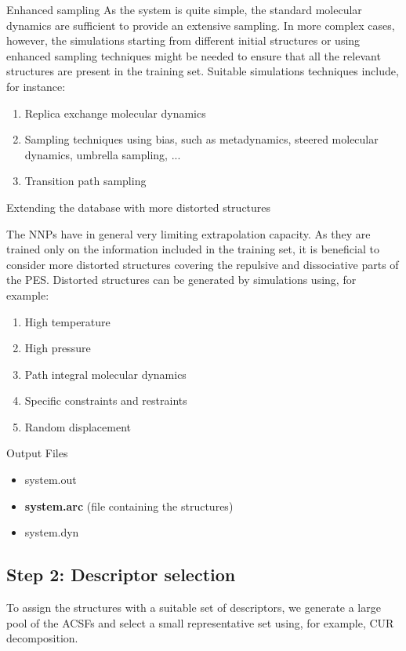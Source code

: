 \documentclass[12pt]{article}
\newcommand\Warning{%
 \makebox[1.4em][c]{%
 \makebox[0pt][c]{\raisebox{.1em}{\small!}}%
 \makebox[0pt][c]{\color{red}\Large$\bigtriangleup$}}}%
\begin{document}
\begin{mybox1}{Enhanced sampling}
\Warning As the system is quite simple, the standard molecular dynamics are sufficient to provide an extensive sampling. In more complex cases, however, the simulations starting from different initial structures or using enhanced sampling techniques might be needed to ensure that all the relevant structures are present in the training set. Suitable simulations techniques include, for instance:
\begin{enumerate}
    \item Replica exchange molecular dynamics
    \item Sampling techniques using bias, such as metadynamics, steered molecular dynamics, umbrella sampling, ...
    \item Transition path sampling
\end{enumerate}
\end{mybox1}
\begin{mybox1}{Extending the database with more distorted structures}

\Warning The NNPs have in general very limiting extrapolation capacity. As they are trained only on the information included in the training set, it is beneficial to consider more distorted structures covering the repulsive and dissociative parts of the PES. Distorted structures can be generated by simulations using, for example: 
\begin{enumerate}
    \item High temperature
    \item High pressure
    \item Path integral molecular dynamics
    \item Specific constraints and restraints
    \item Random displacement
\end{enumerate}

\end{mybox1}
\begin{mybox3}{Output Files}
\begin{itemize}
    \item system.out
    \item \textbf{system.arc} (file containing the structures)
    \item system.dyn
\end{itemize}
\end{mybox3}

\subsection{Step 2: Descriptor selection}
To assign the structures with a suitable set of descriptors, we generate a large pool of the ACSFs and select a small representative set using, for example, CUR decomposition.
\end{document}
